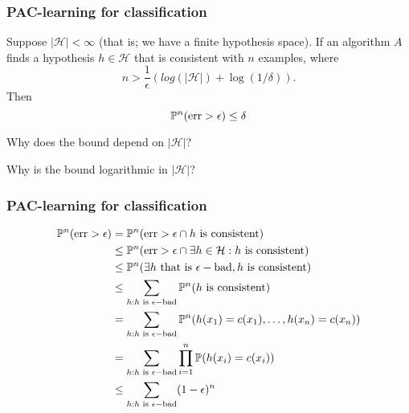 \documentclass[12pt]{beamer}
\begin{document}
\begin{frame}[fragile]
\frametitle{PAC-learning for classification}

\vsp
Suppose $|\mathcal{H}| < \infty$ (that is; we have a finite hypothesis space).  If an algorithm $A$ finds
a hypothesis $h \in \mathcal{H}$ that is  consistent with $n$ examples, where 
\[
n > \frac{1}{\epsilon}(log(|\mathcal{H}|) + \log(1/\delta)).
\]
Then
\[
\P^n(\textrm{err} > \epsilon) \leq \delta
\]

\vsp
Why does the bound depend on $|\mathcal{H}|$?

\pause
{}
\pause
\vsp

Why is the bound logarithmic in $|\mathcal{H}|$?
\pause


\end{frame}

\begin{frame}[fragile]
\frametitle{PAC-learning for classification}
\begin{align*}
\P^n (\textrm{err} > \epsilon) 
& =
\P^n (\textrm{err} > \epsilon \cap h \textrm{ is consistent})  \\
& \leq 
\P^n (\textrm{err} > \epsilon \cap \exists h \in \mathcal{H}: h \textrm{ is consistent})  \\
& \leq 
\P^n (\exists h \textrm{ that is } \epsilon-\textrm{bad}, h \textrm{ is consistent})  \\
& \leq 
\sum_{h: h \textrm{ is } \epsilon-\textrm{bad}} \P^n (h \textrm{ is consistent})  \\
& = 
\sum_{h: h \textrm{ is } \epsilon-\textrm{bad}} \P^n (h(x_1) = c(x_1), \ldots, h(x_n) = c(x_n)) \\
& = 
\sum_{h: h \textrm{ is } \epsilon-\textrm{bad}} \prod_{i=1}^n \P (h(x_i) = c(x_i)) \\
& \leq
\sum_{h: h \textrm{ is } \epsilon-\textrm{bad}} (1-\epsilon)^n
\end{align*}
\end{frame}
\end{document}
